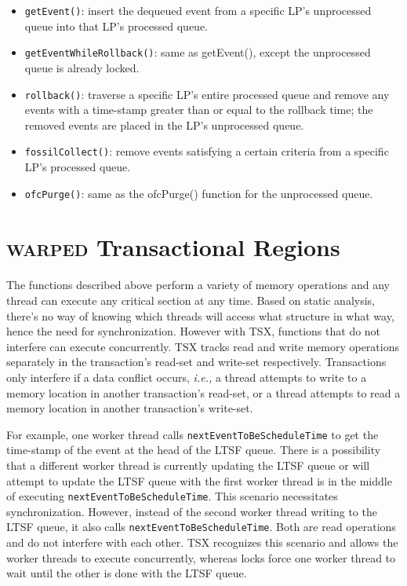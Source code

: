 \documentclass[11pt]{book}
\begin{document}
\vspace*{-\bigskipamount}
\begin{singlespace}
\begin{itemize}
  \item\texttt{getEvent()}: insert the dequeued event from a specific LP's unprocessed
    queue into that LP's processed queue.
  \item\texttt{getEventWhileRollback()}: same as getEvent(), except the unprocessed queue
    is already locked.
  \item\texttt{rollback()}: traverse a specific LP's entire processed queue and remove any
    events with a time-stamp greater than or equal to the rollback time; the removed
    events are placed in the LP's unprocessed queue.
  \item\texttt{fossilCollect()}: remove events satisfying a certain criteria from a
    specific LP's processed queue.
  \item\texttt{ofcPurge()}: same as the ofcPurge() function for the unprocessed queue.
\end{itemize}
\end{singlespace}

\section{\textsc{warped} Transactional Regions}

The functions described above perform a variety of memory operations and any thread can
execute any critical section at any time.  Based on static analysis, there's no way of
knowing which threads will access what structure in what way, hence the need for
synchronization.  However with TSX, functions that do not interfere can execute
concurrently.  TSX tracks read and write memory operations separately in the transaction's
read-set and write-set respectively.  Transactions only interfere if a data conflict
occurs, \emph{i.e.,} a thread attempts to write to a memory location in another
transaction's read-set, or a thread attempts to read a memory location in another
transaction's write-set.

For example, one worker thread calls \texttt{nextEventToBeScheduleTime} to get the
time-stamp of the event at the head of the LTSF queue.  There is a possibility that a
different worker thread is currently updating the LTSF queue or will attempt to update the
LTSF queue with the first worker thread is in the middle of executing
\texttt{nextEventToBeScheduleTime}.  This scenario necessitates synchronization.  However,
instead of the second worker thread writing to the LTSF queue, it also calls
\texttt{nextEventToBeScheduleTime}.  Both are read operations and do not interfere with
each other.  TSX recognizes this scenario and allows the worker threads to execute
concurrently, whereas locks force one worker thread to wait until the other is done with
the LTSF queue.
\end{document}
